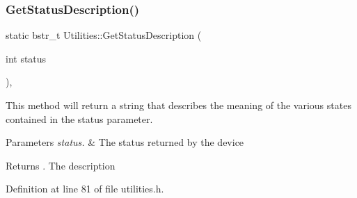 \subsubsection{\texorpdfstring{Get\+Status\+Description()}{GetStatusDescription()}}
{\footnotesize\ttfamily static bstr\+\_\+t Utilities\+::\+Get\+Status\+Description (\begin{DoxyParamCaption}\item[{int}]{status }\end{DoxyParamCaption})\hspace{0.3cm}{\ttfamily [inline]}, {\ttfamily [static]}}

This method will return a string that describes the meaning of the various states contained in the status parameter.


\begin{DoxyParams}{Parameters}
{\em status.} & The status returned by the device \\
\hline
\end{DoxyParams}
\begin{DoxyReturn}{Returns}
. The description 
\end{DoxyReturn}


Definition at line 81 of file utilities.\+h.



